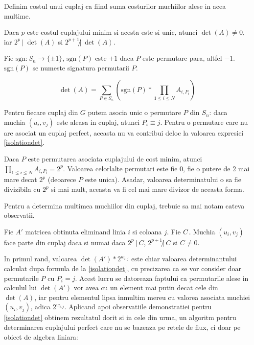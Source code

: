Definim costul unui cuplaj ca fiind suma costurilor muchiilor alese in acea multime.
\begin{lem}
  Daca $p$ este costul cuplajului minim si acesta este si unic, atunci $\det(A) \neq 0$, iar
  $2^{p} \ |\ \det(A)$ si $2^{p+1} \not| \ \det(A)$.
\end{lem}

Fie $\text{sgn} : S_{n} \to \{\pm 1\}$, $\text{sgn}(P)$ este $+1$ daca $P$
este permutare para, altfel $-1$. $\text{sgn}(P)$ se numeste signatura
permutarii $P$.

\begin{equation}
  \label{isolationdet}
  \det(A) = \sum_{P \in S_{n}} (\text{sgn}(P) * \prod_{1 \leq i \leq N} A_{i, P_{i}})
\end{equation}

Pentru fiecare cuplaj din $G$ putem asocia unic o permutare $P$ din $S_{n}$:
daca muchia $(u_{i}, v_{j})$ este aleasa in cuplaj, atunci $P_{i} \equiv j$.
Pentru o permutare care nu are asociat un cuplaj perfect, aceasta nu va
contribui deloc la valoarea expresiei \ref{isolationdet}. \par

Daca $P$ este permutarea asociata cuplajului de cost minim, atunci
$\prod_{1 \leq i \leq N} A_{i, P_{i}} = 2^{p}$. Valoarea celorlalte permutari
este fie $0$, fie o putere de $2$ mai mare decat $2^{p}$ (deoarece $P$ este
unica). Asadar, valoarea determinatului o sa fie divizibila cu $2^{p}$ si
mai mult, aceasta va fi cel mai mare divizor de aceasta forma.

\pagebreak

Pentru a determina multimea muchiilor din cuplaj, trebuie sa mai notam cateva observatii.

\begin{lem}
  Fie $A'$ matricea obtinuta eliminand linia $i$ si coloana $j$. Fie
  $C \def \det(A') * \frac{2^{w_{i,j}}}$. Muchia
  $(u_{i}, v_{j})$ face parte din cuplaj daca si numai daca $2^{p} \ | \ C$,
  $2^{p+1} \not| \ C$ si $C \neq 0$.
\end{lem}

In primul rand, valoarea $\det(A') * 2^{w_{i,j}}$ este chiar valoarea
determinantului calculat dupa formula de la \ref{isolationdet}, cu precizarea ca
se vor consider doar permutarile $P$ cu $P_{i} = j$. Acest lucru se datoreaza
faptului ca permutarile alese in calculul lui $\det(A')$ vor avea cu un element
mai putin decat cele din $\det(A)$, iar pentru elementul lipsa inmultim mereu cu
valorea asociata muchiei $(u_{i}, v_{j})$, adica $2^{w_{i,j}}$.
Aplicand apoi observatiile demonstratiei pentru \ref{isolationdet} obtinem
rezultatul dorit si in cele din urma, un algoritm pentru determinarea cuplajului
perfect care nu se bazeaza pe retele de flux, ci doar pe obiect de algebra
liniara: \par

